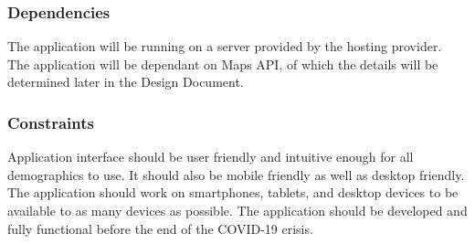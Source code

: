 \subsubsection{Dependencies}

The application will be running on a server provided by the hosting provider.
The application will be dependant on Maps API, of which the details will be determined later in the Design Document.

\subsubsection{Constraints}

Application interface should be user friendly and intuitive enough for all demographics to use.
It should also be mobile friendly as well as desktop friendly.
The application should work on smartphones, tablets, and desktop devices to be available to as many devices as possible.
The application should be developed and fully functional before the end of the COVID-19 crisis.

